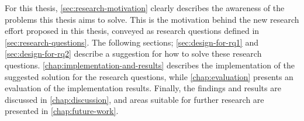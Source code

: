 \noindent
For this thesis, \cref{sec:research-motivation} clearly describes the awareness of the problems this thesis aims to solve. This is the motivation behind the new research effort proposed in this thesis, conveyed as research questions defined in \cref{sec:research-questions}. The following sections; \cref{sec:design-for-rq1} and \cref{sec:design-for-rq2} describe a suggestion for how to solve these research questions. \cref{chap:implementation-and-results} describes the implementation of the suggested solution for the research questions, while \cref{chap:evaluation} presents an evaluation of the implementation results. Finally, the findings and results are discussed in \cref{chap:discussion}, and areas suitable for further research are presented in \cref{chap:future-work}.
%
%
%







